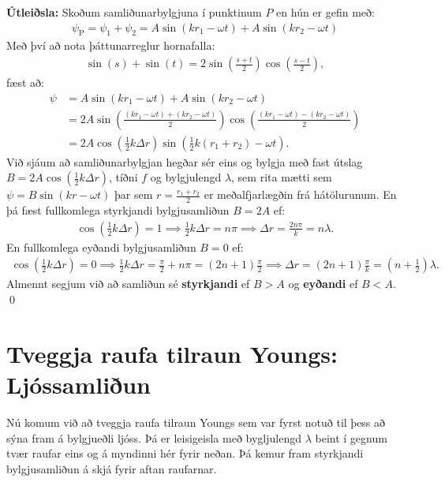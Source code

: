 \textbf{Útleiðsla:} Skoðum samliðunarbylgjuna í punktinum $P$ en hún er gefin með:
\begin{align*}
    \psi_{\text{P}} = \psi_1 + \psi_2 = A \sin(k r_1 - \omega t) +  A \sin(k r_2 - \omega t)
\end{align*}
Með því að nota þáttunarreglur hornafalla:
\begin{align*}
    \sin(s) + \sin(t) = 2\sin(\frac{s+t}{2})\cos(\frac{s-t}{2}),
\end{align*}
fæst að:
\begin{align*}
    \psi &= A \sin(k r_1 - \omega t) +  A \sin(k r_2 - \omega t) \\
    &= 2A\sin(\frac{\left(kr_1 - \omega t\right) + \left(k r_2 -\omega t\right)}{2})\cos(\frac{\left( k r_1 - \omega t \right) - \left( kr_2 - \omega t \right)}{2}) \\
    &= 2A\cos(\frac{1}{2}k\Delta r)\sin(\frac{1}{2}k(r_1+r_2)-\omega t).
\end{align*}
Við sjáum að samliðunarbylgjan hegðar sér eins og bylgja með fast útslag $B = 2A\cos(\frac{1}{2}k\Delta r)$, tíðni $f$ og bylgjulengd $\lambda$, sem rita mætti sem $\psi = B\sin(kr - \omega t)$ þar sem $r =  \frac{r_1 + r_2}{2}$ er meðalfjarlægðin frá hátölurunum. En þá fæst fullkomlega styrkjandi bylgjusamliðun $B = 2A$ ef:
\begin{align*}
    \cos(\frac{1}{2}k\Delta r) = 1 \implies \frac{1}{2}k\Delta r = n\pi \implies \Delta r = \frac{2n\pi}{k} = n\lambda.
\end{align*}
En fullkomlega eyðandi bylgjusamliðun $B = 0$ ef:
\begin{align*}
    \cos(\frac{1}{2}k\Delta r) = 0 \implies \frac{1}{2}k\Delta r = \frac{\pi}{2} + n\pi = (2n+1)\frac{\pi}{2} \implies \Delta r = (2n +1)\frac{\pi}{k} = \left(n + \frac{1}{2}\right)\lambda.
\end{align*}
Almennt segjum við að samliðun sé \textbf{styrkjandi} ef $B > A$ og \textbf{eyðandi} ef $B < A$. \qed



\section{Tveggja raufa tilraun Youngs: Ljóssamliðun}

Nú komum við að tveggja raufa tilraun Youngs sem var fyrst notuð til þess að sýna fram á bylgjueðli ljóss. Þá er leisigeisla með bygljulengd $\lambda$ beint í gegnum tvær raufar eins og á myndinni hér fyrir neðan. Þá kemur fram styrkjandi bylgjusamliðun á skjá fyrir aftan raufarnar.

